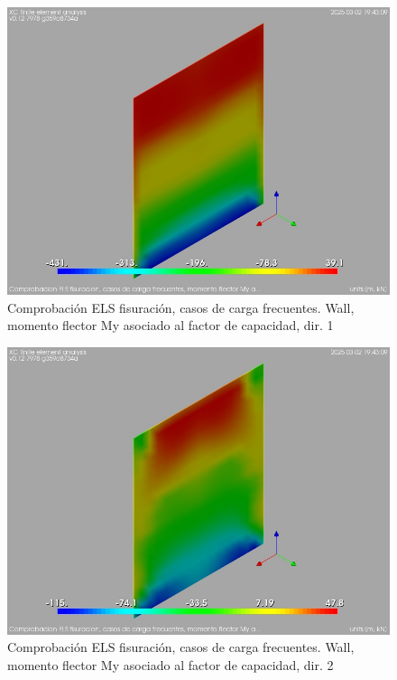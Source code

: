 \begin{figure}[ht]
\begin{center}
\includegraphics[width=\linewidth]{results/graphics/crackingSLS_freq/wallMySect1}
\caption{Comprobación ELS fisuración, casos de carga frecuentes. Wall, momento flector My asociado al factor de capacidad, dir. 1}
\label{SLS_frequentLoadsCrackControlwallMySect1}
\end{center}
\end{figure}
\begin{figure}[ht]
\begin{center}
\includegraphics[width=\linewidth]{results/graphics/crackingSLS_freq/wallMySect2}
\caption{Comprobación ELS fisuración, casos de carga frecuentes. Wall, momento flector My asociado al factor de capacidad, dir. 2}
\label{SLS_frequentLoadsCrackControlwallMySect2}
\end{center}
\end{figure}
